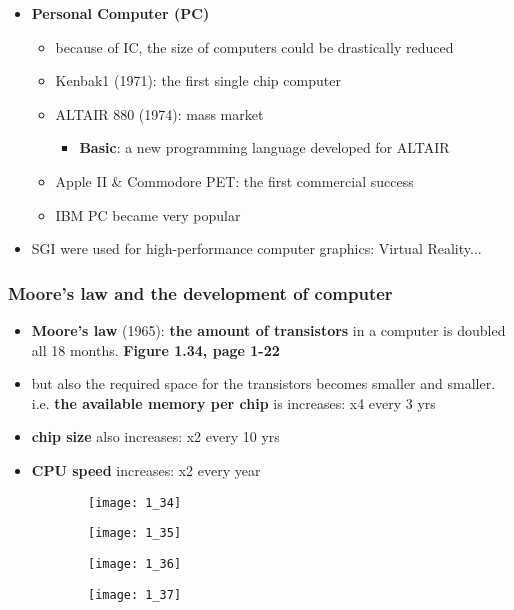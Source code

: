 \documentclass{standalone}
\begin{document}
\begin{itemize}
\begin{itemize}
		\end{itemize}
	\item \textbf{Personal Computer (PC)}
		\begin{itemize}
			\item because of IC, the size of computers could be drastically reduced
			\item Kenbak1 (1971): the first single chip computer
			\item ALTAIR 880 (1974): mass market
				\begin{itemize}
					\item \textbf{Basic}: a new programming language developed for ALTAIR
				\end{itemize}
			\item Apple II \& Commodore PET: the first commercial success
			\item IBM PC became very popular
		\end{itemize}
	\item SGI were used for high-performance computer graphics: Virtual Reality...
\end{itemize}

\subsubsection*{Moore's law and the development of computer}

\begin{itemize}
	\item \textbf{Moore's law} (1965): \textbf{the amount of transistors} in a computer is doubled all 18 months. \textbf{Figure 1.34, page 1-22}
	\item but also the required space for the transistors becomes smaller and smaller. i.e. \textbf{the available memory per chip} is increases: x4 every 3 yrs
	\item \textbf{chip size} also increases: x2 every 10 yrs 
	\item \textbf{CPU speed} increases: x2 every year
\end{itemize}

\begin{figure}[h]
	\centering
	\begin{subfigure}[b]{0.45\textwidth}
		\texttt{[image: 1\_34]}
	\end{subfigure}
	\begin{subfigure}[b]{0.45\textwidth}
		\texttt{[image: 1\_35]}
	\end{subfigure}
	\begin{subfigure}[b]{0.45\textwidth}
		\texttt{[image: 1\_36]}
	\end{subfigure}
	\begin{subfigure}[b]{0.45\textwidth}
		\texttt{[image: 1\_37]}
	\end{subfigure}
\end{figure}
\end{document}
